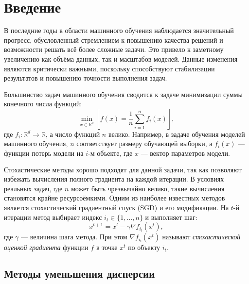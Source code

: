\section{Введение}

В последние годы в области машинного обучения наблюдается значительный прогресс, обусловленный стремлением к повышению качества решений и возможности решать всё более сложные задачи. Это привело к заметному увеличению как объёма данных, так и масштабов моделей. Данные изменения являются критически важными, поскольку способствуют стабилизации результатов и повышению точности выполнения задач.

Большинство задач машинного обучения сводится к задаче минимизации суммы конечного числа функций:
\[
\underset{x\in\mathbb R^d}{\min}\left[f(x) = \frac{1}{n}\sum\limits_{i=1}^n f_i(x)\right],
\]
где \(f_i: \mathbb R^d \rightarrow \mathbb R\), а число функций \(n\) велико. Например, в задаче обучения моделей машинного обучения, \(n\) соответствует размеру обучающей выборки, а \(f_i(x)\) — функции потерь модели на \(i\)-м объекте, где \(x\) — вектор параметров модели.

Стохастические методы хорошо подходят для данной задачи, так как позволяют избежать вычисления полного градиента на каждой итерации. В условиях реальных задач, где \(n\) может быть чрезвычайно велико, такие вычисления становятся крайне ресурсоёмкими. Одним из наиболее известных методов является стохастический градиентный спуск (\textsc{SGD}) и его модификации. На \(t\)-й итерации метод выбирает индекс \(i_t\in\{1,\ldots,n\}\) и выполняет шаг:
\[
x^{t+1} = x^t - \gamma \nabla f_{i_t}(x^t),
\]
где \(\gamma\) — величина шага метода. При этом $\nabla f_{i_t}(x^t)$ называют \textit{стохастической оценкой градиента} функции \(f\) в точке \(x^t\) по объекту \(i_t\). 

\subsection*{Методы уменьшения дисперсии}


